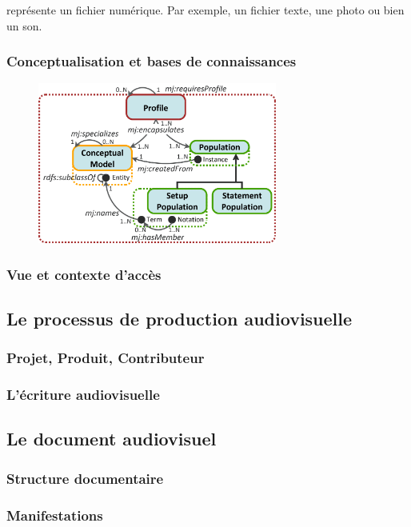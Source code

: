  représente un fichier numérique. Par exemple, un fichier texte, une photo ou bien un son. 



\subsubsection{Conceptualisation et bases de connaissances}\label{}
\begin{figure}[ht!]
\centering
\includegraphics[width=0.7\textwidth]{./images/MOD-Profile-v3.png}
\caption{}
\label{img:conceptualisation}
\end{figure}


\subsubsection{Vue et contexte d'accès}\label{}


\subsection{Le processus de production audiovisuelle}\label{}
\subsubsection{Projet, Produit, Contributeur}\label{}
\subsubsection{L'écriture audiovisuelle}\label{}


\subsection{Le document audiovisuel}\label{}
\subsubsection{Structure documentaire}\label{}
\subsubsection{Manifestations}




